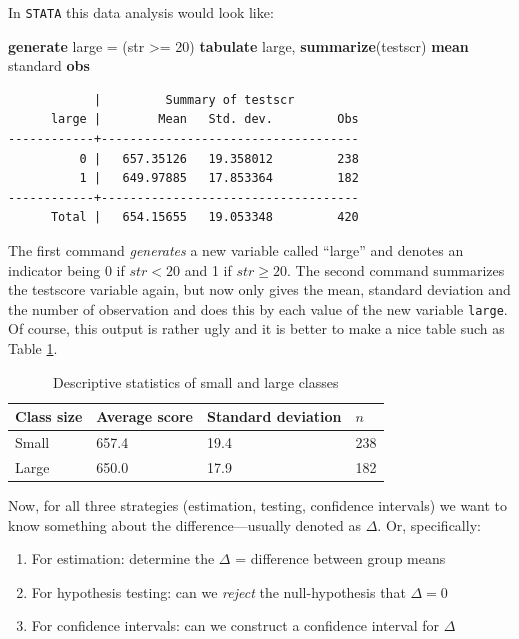 \documentclass[
]{book}
\newenvironment{Shaded}{\begin{snugshade}}{\end{snugshade}}
\newcommand{\KeywordTok}[1]{\textcolor[rgb]{0.13,0.29,0.53}{\textbf{#1}}}
\newcommand{\NormalTok}[1]{#1}
\providecommand{\tightlist}{%
  \setlength{\itemsep}{0pt}\setlength{\parskip}{0pt}}
\begin{document}
In \texttt{STATA} this data analysis would look like:

\begin{Shaded}
\begin{Highlighting}[]
\KeywordTok{generate}\NormalTok{ large = (str \textgreater{}= 20)}
\KeywordTok{tabulate}\NormalTok{ large, }\KeywordTok{summarize}\NormalTok{(testscr) }\KeywordTok{mean}\NormalTok{ standard }\KeywordTok{obs}
\end{Highlighting}
\end{Shaded}

\begin{verbatim}
            |         Summary of testscr
      large |        Mean   Std. dev.         Obs
------------+------------------------------------
          0 |   657.35126   19.358012         238
          1 |   649.97885   17.853364         182
------------+------------------------------------
      Total |   654.15655   19.053348         420
\end{verbatim}

The first command \emph{generates} a new variable called ``large'' and denotes an indicator being 0 if \(str < 20\) and 1 if \(str \geq 20\). The second command summarizes the testscore variable again, but now only gives the mean, standard deviation and the number of observation and does this by each value of the new variable \texttt{large}. Of course, this output is rather ugly and it is better to make a nice table such as Table \ref{tab:smalllarge}.

\begin{table}

\caption{\label{tab:smalllarge}Descriptive statistics of small and large classes}
\centering
\begin{tabular}[t]{llll}
\toprule
Class size & Average score & Standard deviation & $n$\\
\midrule
Small & 657.4 & 19.4 & 238\\
Large & 650.0 & 17.9 & 182\\
\bottomrule
\end{tabular}
\end{table}

Now, for all three strategies (estimation, testing, confidence intervals) we want to know something about the difference---usually denoted as \(\Delta\). Or, specifically:

\begin{enumerate}
\def\labelenumi{\arabic{enumi}.}
\tightlist
\item
  For estimation: determine the \(\Delta\) = difference between group means
\item
  For hypothesis testing: can we \emph{reject} the null-hypothesis that \(\Delta = 0\)
\item
  For confidence intervals: can we construct a confidence interval for \(\Delta\)
\end{enumerate}
\end{document}
